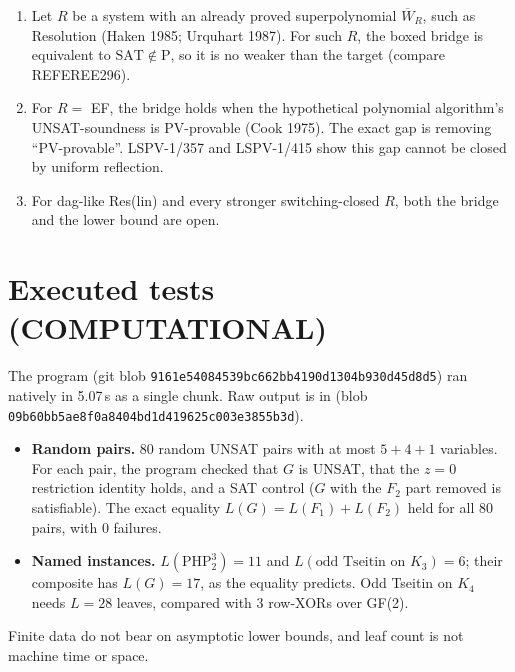 \documentclass[11pt]{article}
\begin{document}
\begin{corollary}
\begin{enumerate}
\item[(a)] Let $R$ be a system with an already proved superpolynomial $\overline W_R$, such as Resolution (Haken 1985; Urquhart 1987). For such $R$, the boxed bridge is equivalent to $\mathrm{SAT}\notin\mathrm P$, so it is no weaker than the target (compare REFEREE296).
\item[(b)] For $R=$ EF, the bridge holds when the hypothetical polynomial algorithm's UNSAT-soundness is PV-provable (Cook 1975). The exact gap is removing ``PV-provable''. LSPV-1/357 and LSPV-1/415 show this gap cannot be closed by uniform reflection.
\item[(c)] For dag-like Res(lin) and every stronger switching-closed $R$, both the bridge and the lower bound are open.
\end{enumerate}
\end{corollary}

\section{Executed tests (COMPUTATIONAL)}
The program  (git blob \texttt{9161e54084539bc662bb4190d1304b930d45d8d5}) ran natively in 5.07\,s as a single chunk. Raw output is in  (blob \texttt{09b60bb5ae8f0a8404bd1d419625c003e3855b3d}).
\begin{itemize}
\item \textbf{Random pairs.} 80 random UNSAT pairs with at most $5+4+1$ variables. For each pair, the program checked that $G$ is UNSAT, that the $z=0$ restriction identity holds, and a SAT control ($G$ with the $F_2$ part removed is satisfiable). The exact equality $L(G)=L(F_1)+L(F_2)$ held for all 80 pairs, with 0 failures.
\item \textbf{Named instances.} $L(\mathrm{PHP}^3_2)=11$ and $L(\text{odd Tseitin on }K_3)=6$; their composite has $L(G)=17$, as the equality predicts. Odd Tseitin on $K_4$ needs $L=28$ leaves, compared with 3 row-XORs over GF(2).
\end{itemize}
Finite data do not bear on asymptotic lower bounds, and leaf count is not machine time or space.
\end{document}
